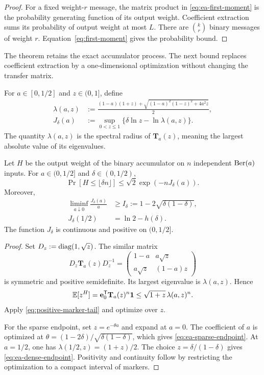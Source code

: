 \begin{proof}
For a fixed weight-$r$ message, the matrix product in
\eqref{eq:ea-first-moment} is the probability generating function of its
output weight.  Coefficient extraction sums its probability of output weight
at most $L$.  There are $\binom{k}{r}$ binary messages of weight $r$.
Equation~\eqref{eq:first-moment} gives the probability bound.
\end{proof}

The theorem retains the exact accumulator process.  The next bound replaces
coefficient extraction by a one-dimensional optimization without changing
the transfer matrix.

For $a\in[0,1/2]$ and $z\in(0,1]$, define
\begin{align}
 \lambda(a,z)
 &:=\frac{(1-a)(1+z)+
 \sqrt{(1-a)^2(1-z)^2+4a^2z}}{2},
 \label{eq:ea-spectral-radius}\\
 J_\delta(a)&:=
 \sup_{0<z\leq1}\{\delta\ln z-\ln\lambda(a,z)\}.
 \label{eq:ea-rate-function}
\end{align}
The quantity $\lambda(a,z)$ is the spectral radius of
$\mathbf T_a(z)$, meaning the largest absolute value of its eigenvalues.

\begin{lemma}
\label{lem:ea-lower-tail}
Let $H$ be the output weight of the binary accumulator on $n$ independent
$\operatorname{Ber}(a)$ inputs.  For $a\in(0,1/2]$ and $\delta\in(0,1/2)$,
\begin{equation}
 \Pr[H\leq\lfloor\delta n\rfloor]
 \leq\sqrt2\exp(-nJ_\delta(a)).
 \label{eq:ea-lower-tail}
\end{equation}
Moreover,
\begin{align}
 \liminf_{a\downarrow0}\frac{J_\delta(a)}a
 &\geq I_\delta:=1-2\sqrt{\delta(1-\delta)},
 \label{eq:ea-sparse-endpoint}\\
 J_\delta(1/2)&=\ln2-h(\delta).
 \label{eq:ea-dense-endpoint}
\end{align}
The function $J_\delta$ is continuous and positive on $(0,1/2]$.
\end{lemma}

\begin{proof}
Set $D_z:=\operatorname{diag}(1,\sqrt z)$.  The similar matrix
\[
 D_z\mathbf T_a(z)D_z^{-1}
 =\begin{pmatrix}1-a&a\sqrt z\\a\sqrt z&(1-a)z\end{pmatrix}
\]
is symmetric and positive semidefinite.  Its largest eigenvalue is
$\lambda(a,z)$.  Hence
\[
 \mathbb E[z^H]
 =\mathbf e_0^{\mathsf T}\mathbf T_a(z)^n\mathbf 1
 \leq\sqrt{1+z}\,\lambda(a,z)^n.
\]
Apply \eqref{eq:positive-marker-tail} and optimize over $z$.

For the sparse endpoint, set $z=e^{-\theta a}$ and expand at $a=0$.
The coefficient of $a$ is optimized at
$\theta=(1-2\delta)/\sqrt{\delta(1-\delta)}$, which gives
\eqref{eq:ea-sparse-endpoint}.  At $a=1/2$, one has
$\lambda(1/2,z)=(1+z)/2$.  The choice $z=\delta/(1-\delta)$ gives
\eqref{eq:ea-dense-endpoint}.  Positivity and continuity follow by restricting
the optimization to a compact interval of markers.
\end{proof}


